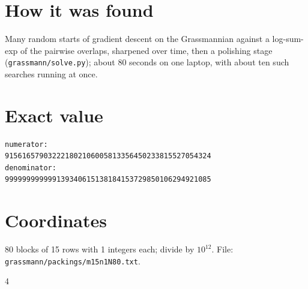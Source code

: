 \documentclass[11pt,a4paper]{article}
\begin{document}
\section{How it was found}
Many random starts of gradient descent on the Grassmannian against a log-sum-exp of the pairwise overlaps, sharpened over time, then a polishing stage (\texttt{grassmann/solve.py}); about 80 seconds on one laptop, with about ten such searches running at once.


\appendix
\section{Exact value}
{\small
\begin{verbatim}
numerator:
915616579032221802106005813356450233815527054324
denominator:
999999999999139340615138184153729850106294921085
\end{verbatim}}

\section{Coordinates}
80 blocks of 15 rows with 1 integers each; divide by $10^{12}$. File: \texttt{grassmann/packings/m15n1N80.txt}.
{\tiny
\begin{multicols}{4}
\end{multicols}}
\end{document}
